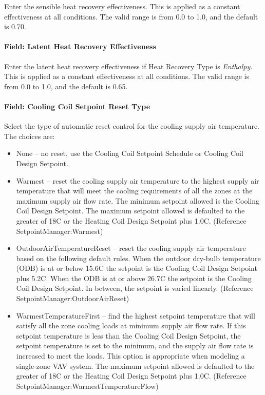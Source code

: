 Enter the sensible heat recovery effectiveness. This is applied as a constant effectiveness at all conditions. The valid range is from 0.0 to 1.0, and the default is 0.70.

\paragraph{Field: Latent Heat Recovery Effectiveness}\label{field-latent-heat-recovery-effectiveness-4}

Enter the latent heat recovery effectiveness if Heat Recovery Type is \emph{Enthalpy}. This is applied as a constant effectiveness at all conditions. The valid range is from 0.0 to 1.0, and the default is 0.65.

\paragraph{Field: Cooling Coil Setpoint Reset Type}\label{field-cooling-coil-setpoint-reset-type}

Select the type of automatic reset control for the cooling supply air temperature. The choices are:

\begin{itemize}
\item
  None -- no reset, use the Cooling Coil Setpoint Schedule or Cooling Coil Design Setpoint.
\item
  Warmest -- reset the cooling supply air temperature to the highest supply air temperature that will meet the cooling requirements of all the zones at the maximum supply air flow rate. The minimum setpoint allowed is the Cooling Coil Design Setpoint. The maximum setpoint allowed is defaulted to the greater of 18C or the Heating Coil Design Setpoint plus 1.0C. (Reference SetpointManager:Warmest)
\item
  OutdoorAirTemperatureReset -- reset the cooling supply air temperature based on the following default rules. When the outdoor dry-bulb temperature (ODB) is at or below 15.6C the setpoint is the Cooling Coil Design Setpoint plus 5.2C. When the ODB is at or above 26.7C the setpoint is the Cooling Coil Design Setpoint. In between, the setpoint is varied linearly. (Reference SetpointManager:OutdoorAirReset)
\item
  WarmestTemperatureFirst -- find the highest setpoint temperature that will satisfy all the zone cooling loads at minimum supply air flow rate. If this setpoint temperature is less than the Cooling Coil Design Setpoint, the setpoint temperature is set to the minimum, and the supply air flow rate is increased to meet the loads. This option is appropriate when modeling a single-zone VAV system. The maximum setpoint allowed is defaulted to the greater of 18C or the Heating Coil Design Setpoint plus 1.0C. (Reference SetpointManager:WarmestTemperatureFlow)
\end{itemize}

